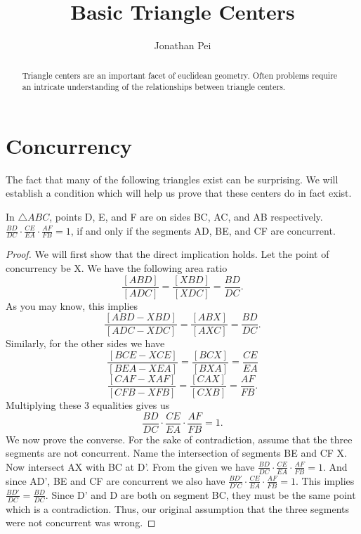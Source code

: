 \documentclass[11pt]{scrartcl}
\theoremstyle{plain}
\begin{document}
\title{Basic Triangle Centers}
\author{Jonathan Pei}
\subtitle{}
\maketitle

\begin{abstract}
    Triangle centers are an important facet of euclidean geometry.
    Often problems require an intricate understanding of the relationships between triangle centers.
\end{abstract}

\section{Concurrency}
    The fact that many of the following triangles exist can be surprising. We will establish a condition which will help us prove that these centers do in fact exist.
        \begin{theorem}[Ceva's] 
            In $\triangle ABC$, points D, E, and F are on sides BC, AC, and AB respectively. $\frac{BD}{DC}\cdot \frac{CE}{EA}\cdot\frac{AF}{FB} = 1$, if and only if the segments AD, BE, and CF are concurrent.
            
        \end{theorem}
        
    \begin{proof}
        We will first show that the direct implication holds. Let the point of concurrency be X. We have the following area ratio 
        $$\frac{[ABD]}{[ADC]} = \frac{[XBD]}{[XDC]}=\frac{BD}{DC}.$$
        As you may know, this implies $$\frac{[ABD-XBD]}{[ADC-XDC]}=\frac{[ABX]}{[AXC]}=\frac{BD}{DC}.$$
        Similarly, for the other sides we have 
        $$\frac{[BCE-XCE]}{[BEA-XEA]}=\frac{[BCX]}{[BXA]}=\frac{CE}{EA}$$
        $$\frac{[CAF-XAF]}{[CFB-XFB]}=\frac{[CAX]}{[CXB]}=\frac{AF}{FB}.$$
        Multiplying these 3 equalities gives us 
        $$\frac{BD}{DC}\cdot \frac{CE}{EA}\cdot\frac{AF}{FB} = 1.$$
        We now prove the converse. For the sake of contradiction, assume that the three segments are not concurrent.
        Name the intersection of segments BE and CF X. Now intersect AX with BC at D'. From the given we have $\frac{BD}{DC}\cdot \frac{CE}{EA}\cdot\frac{AF}{FB} = 1.$
        And since AD', BE and CF are concurrent we also have $\frac{BD'}{D'C}\cdot \frac{CE}{EA}\cdot\frac{AF}{FB} = 1.$
        This implies $\frac{BD'}{DC}=\frac{BD}{DC}$. Since D' and D are both on segment BC, they must be the same point which is a contradiction. Thus, our original assumption 
        that the three segments were not concurrent was wrong.
    \end{proof} 
 
\end{document}
